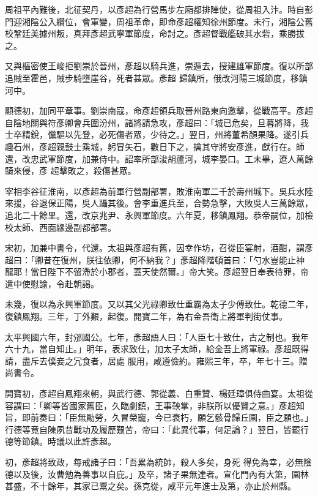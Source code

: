 \begin{pinyinscope}
 周祖平內難後，北征契丹，以彥超為行營馬步左廂都排陣使，從周祖入汴。時自彭門迎湘陰公入纘位，會軍變，周祖革命，即命彥超權知徐州節度。未行，湘陰公舊校鞏廷美據州叛，真拜彥超武寧軍節度，命討之。彥超督戰艦破其水砦，乘勝拔之。



 又與樞密使王峻拒劉崇於晉州，彥超以騎兵進，崇遁去，授建雄軍節度。復以所部追賊至霍邑，賊步騎墮崖谷，死者甚眾。彥超
 歸鎮所，俄改河陽三城節度，移鎮河中。



 顯德初，加同平章事。劉崇南寇，命彥超領兵取晉州路東向邀擊，從戰高平。彥超自陰地關與符彥卿會兵圍汾州，諸將請急攻，彥超曰：「城已危矣，旦暮將降，我士卒精銳，儻驅以先登，必死傷者眾，少待之。」翌日，州將董希顏果降。遂引兵趣石州，彥超親鼓士乘城，躬冒矢石，數日下之，擒其守將安彥進，獻行在。師還，改忠武軍節度，加兼侍中。詔率所部浚胡蘆河，城李晏口。工未畢，遼人萬餘騎來侵，彥
 超擊敗之，殺傷甚眾。



 宰相李谷征淮南，以彥超為前軍行營副部署，敗淮南軍二千於壽州城下。吳兵水陸來援，谷退保正陽，吳人躡其後。會李重進兵至，合勢急擊，大敗吳人三萬餘眾，追北二十餘里。還，改京兆尹、永興軍節度。六年夏，移鎮鳳翔。恭帝嗣位，加檢校太師、西面緣邊副都部署。



 宋初，加兼中書令，代還。太祖與彥超有舊，因幸作坊，召從臣宴射，酒酣，謂彥超曰：「卿昔在復州，朕往依卿，何不納我？」彥超降階頓首曰：「勺水豈能止神
 龍耶！當日陛下不留滯於小郡者，蓋天使然爾。」帝大笑。彥超翌日奉表待罪，帝遣中使慰諭，令赴朝謁。



 未幾，復以為永興軍節度。又以其父光祿卿致仕重霸為太子少傅致仕。乾德二年，復鎮鳳翔。三年，丁外艱，起復。開寶二年，為右金吾衛上將軍判街仗事。



 太平興國六年，封邠國公。七年，彥超語人曰：「人臣七十致仕，古之制也。我年六十九，當自知止。」明年，表求致仕，加太子太師，給金吾上將軍祿。彥超既得請，盡斥去僕妾之冗食者，居處
 服用，咸遵儉約。雍熙三年，卒，年七十三。贈尚書令。



 開寶初，彥超自鳳翔來朝，與武行德、郭從義、白重贊、楊廷璋俱侍曲宴。太祖從容謂曰：「卿等皆國家舊臣，久臨劇鎮，王事鞅掌，非朕所以優賢之意。」彥超知旨，即前奏曰：「臣無勛勞，久冒榮寵，今已衰朽，願乞骸骨歸丘園，臣之願也。」行德等竟自陳夙昔戰功及履歷艱苦，帝曰：「此異代事，何足論？」翌日，皆罷行德等節鎮。時議以此許彥超。



 初，彥超將致政，每戒諸子曰：「吾累為統帥，殺人多矣，身死
 得免為幸，必無陰德以及後，汝曹勉為善事以自庇。」及卒，諸子果無達者。宣化門內有大第，園林甚盛，不十餘年，其家已鬻之矣。孫克從，咸平元年進士及第，亦止於州縣。




\end{pinyinscope}
